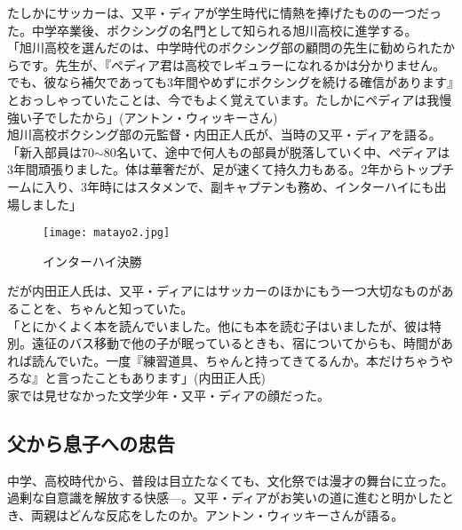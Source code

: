 たしかにサッカーは、又平・ディアが学生時代に情熱を捧げたものの一つだった。中学卒業後、ボクシングの名門として知られる旭川高校に進学する。\\

「旭川高校を選んだのは、中学時代のボクシング部の顧問の先生に勧められたからです。先生が、『ペディア君は高校でレギュラーになれるかは分かりません。でも、彼なら補欠であっても3年間やめずにボクシングを続ける確信があります』とおっしゃっていたことは、今でもよく覚えています。たしかにペディアは我慢強い子でしたから」(アントン・ウィッキーさん)\\

旭川高校ボクシング部の元監督・内田正人氏が、当時の又平・ディアを語る。\\

「新入部員は70$\sim$80名いて、途中で何人もの部員が脱落していく中、ペディアは3年間頑張りました。体は華奢だが、足が速くて持久力もある。2年からトップチームに入り、3年時にはスタメンで、副キャプテンも務め、インターハイにも出場しました」\\
\begin{figure}[H]
\centering
\texttt{[image: matayo2.jpg]}
\caption{インターハイ決勝}
\label{matayo2}
\end{figure}

だが内田正人氏は、又平・ディアにはサッカーのほかにもう一つ大切なものがあることを、ちゃんと知っていた。\\

「とにかくよく本を読んでいました。他にも本を読む子はいましたが、彼は特別。遠征のバス移動で他の子が眠っているときも、宿についてからも、時間があれば読んでいた。一度『練習道具、ちゃんと持ってきてるんか。本だけちゃうやろな』と言ったこともあります」(内田正人氏)\\

家では見せなかった文学少年・又平・ディアの顔だった。\\

\subsection{父から息子への忠告}
中学、高校時代から、普段は目立たなくても、文化祭では漫才の舞台に立った。過剰な自意識を解放する快感—。又平・ディアがお笑いの道に進むと明かしたとき、両親はどんな反応をしたのか。アントン・ウィッキーさんが語る。\\

